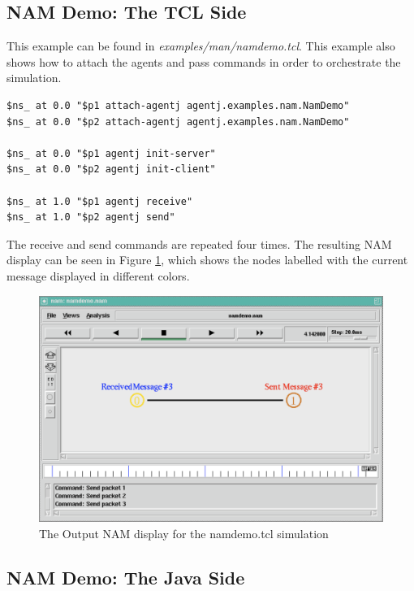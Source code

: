  \subsection{NAM Demo: The TCL Side}
 \label{jni:tclside}

This example can be found in \emph{examples/man/namdemo.tcl}. This example also shows how to attach the agents and pass commands in order to orchestrate the simulation. 

\footnotesize
\begin{verbatim}
$ns_ at 0.0 "$p1 attach-agentj agentj.examples.nam.NamDemo"
$ns_ at 0.0 "$p2 attach-agentj agentj.examples.nam.NamDemo"

$ns_ at 0.0 "$p1 agentj init-server"
$ns_ at 0.0 "$p2 agentj init-client"

$ns_ at 1.0 "$p1 agentj receive"
$ns_ at 1.0 "$p2 agentj send"
\end{verbatim}
\normalsize

\noindent The receive and send commands are repeated four times.  The resulting NAM display can be seen in Figure \ref{fig:namdemo}, which shows the nodes labelled with the  current message displayed in different colors.

\begin{figure}
\centering
\includegraphics[scale=0.45]{images/namdemo}
\caption{The Output NAM display for the namdemo.tcl simulation}
\label{fig:namdemo}
\end{figure}
 
 \subsection{NAM Demo: The Java Side}
 \label{sec:nam:javaside}
 
